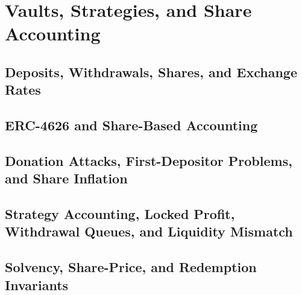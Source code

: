 \chapter{Vaults, Strategies, and Share Accounting}

\section{Deposits, Withdrawals, Shares, and Exchange Rates}

\section{ERC-4626 and Share-Based Accounting}

\section{Donation Attacks, First-Depositor Problems, and Share Inflation}

\section{Strategy Accounting, Locked Profit, Withdrawal Queues, and Liquidity Mismatch}

\section{Solvency, Share-Price, and Redemption Invariants}
